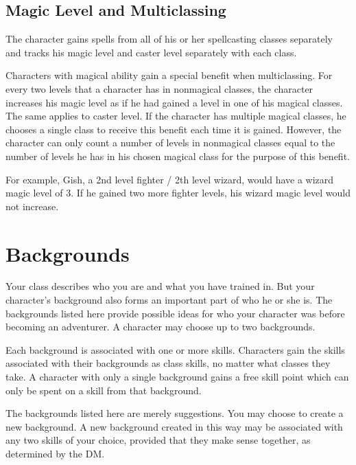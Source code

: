 \subsection{Magic Level and Multiclassing} The character gains spells from all of his or her spellcasting classes separately and tracks his magic level and caster level separately with each class.

Characters with magical ability gain a special benefit when multiclassing. For every two levels that a character has in nonmagical classes, the character increases his magic level as if he had gained a level in one of his magical classes. The same applies to caster level. If the character has multiple magical classes, he chooses a single class to receive this benefit each time it is gained. However, the character can only count a number of levels in nonmagical classes equal to the number of levels he has in his chosen magical class for the purpose of this benefit.

For example, Gish, a 2nd level fighter / 2th level wizard, would have a wizard magic level of 3. If he gained two more fighter levels, his wizard magic level would not increase.

\section{Backgrounds}
Your class describes who you are and what you have trained in. But your character's background also forms an important part of who he or she is. The backgrounds listed here provide possible ideas for who your character was before becoming an adventurer. A character may choose up to two backgrounds.

Each background is associated with one or more skills. Characters gain the skills associated with their backgrounds as class skills, no matter what classes they take. A character with only a single background gains a free skill point which can only be spent on a skill from that background.

The backgrounds listed here are merely suggestions. You may choose to create a new background. A new background created in this way may be associated with any two skills of your choice, provided that they make sense together, as determined by the DM.


